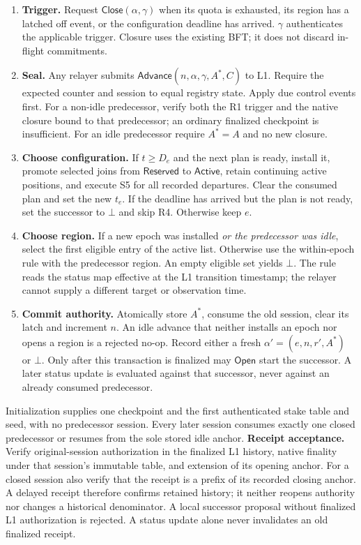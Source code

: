 \documentclass[11pt,a4paper]{article}
\newcommand{\Tag}[1]{\ensuremath{\mathsf{#1}}}
\newcommand{\Proc}[1]{\mathsf{#1}}
\begin{document}
\begin{enumerate}[label=\textbf{R\arabic*.},itemsep=4pt]
\item \textbf{Trigger.} Request $\Proc{Close}(\alpha,\gamma)$ when its
quota is exhausted, its region has a latched off event, or the configuration
deadline has arrived. $\gamma$ authenticates the applicable trigger.
Closure uses the existing BFT; it does not discard in-flight commitments.
\item \textbf{Seal.} Any relayer submits
$\Proc{Advance}(n,\alpha,\gamma,A^*,C)$ to L1. Require the expected counter
and session to equal registry state. Apply due control events first.
For a non-idle predecessor, verify both the R1 trigger and the native
closure bound to that predecessor; an ordinary finalized checkpoint is
insufficient. For an idle predecessor require $A^*=A$ and no new closure.
\item \textbf{Choose configuration.} If $t\ge D_e$ and the next plan is
ready, install it, promote selected joins from \Tag{Reserved} to
\Tag{Active}, retain continuing active positions, and execute S5 for
all recorded departures. Clear the consumed plan and set the new $t_e$.
If the deadline has arrived but the plan is not ready, set the successor
to $\bot$ and skip R4. Otherwise keep $e$.
\item \textbf{Choose region.} If a new epoch was installed \emph{or the
predecessor was idle}, select the first eligible entry of the active list.
Otherwise use the within-epoch rule with the predecessor region.
An empty eligible set yields $\bot$.
The rule reads the status map effective at the L1 transition timestamp;
the relayer cannot supply a different target or observation time.
\item \textbf{Commit authority.} Atomically store $A^*$, consume the old
session, clear its latch and increment $n$. An idle advance that neither
installs an epoch nor opens a region is a rejected no-op. Record either a fresh
$\alpha'=(e,n,r',A^*)$ or $\bot$. Only after this transaction is finalized
may $\Proc{Open}$ start the successor. A later status update is evaluated
against that successor, never against an already consumed predecessor.
\end{enumerate}

Initialization supplies one checkpoint and the first authenticated stake
table and seed, with no predecessor session. Every later session consumes
exactly one closed predecessor or resumes from the sole stored idle anchor.
\textbf{Receipt acceptance.} Verify original-session authorization in the
finalized L1 history, native finality under that session's immutable table,
and extension of its opening anchor. For a closed session also verify that
the receipt is a prefix of its recorded closing anchor. A delayed receipt
therefore confirms retained history; it neither reopens authority nor
changes a historical denominator. A local successor proposal without
finalized L1 authorization is rejected. A status update alone never
invalidates an old finalized receipt.
\end{document}
